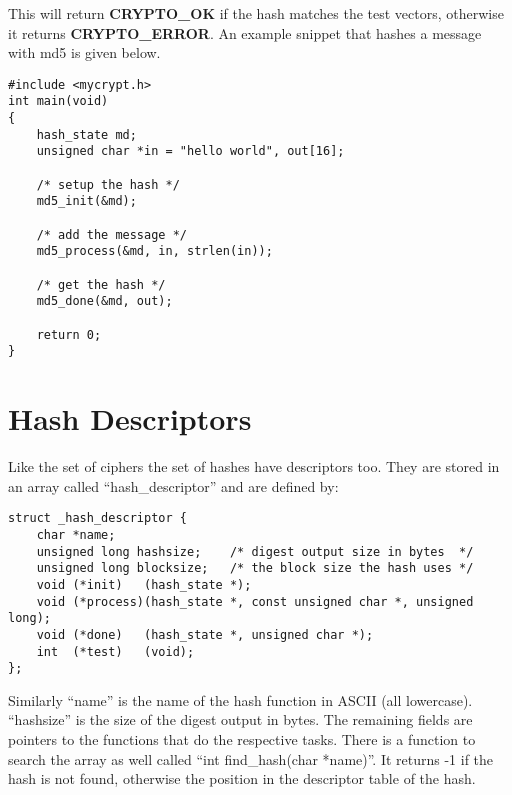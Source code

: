 \documentclass{book}
\begin{document}
This will return {\bf CRYPTO\_OK} if the hash matches the test vectors, otherwise it returns {\bf CRYPTO\_ERROR}.  An
example snippet that hashes a message with md5 is given below.
\begin{small}
\begin{verbatim}
#include <mycrypt.h>
int main(void)
{
    hash_state md;
    unsigned char *in = "hello world", out[16];

    /* setup the hash */
    md5_init(&md);

    /* add the message */
    md5_process(&md, in, strlen(in));

    /* get the hash */
    md5_done(&md, out);

    return 0;
}
\end{verbatim}
\end{small}

\section{Hash Descriptors}
Like the set of ciphers the set of hashes have descriptors too.  They are stored in an array called ``hash\_descriptor'' and
are defined by:
\begin{verbatim}
struct _hash_descriptor {
    char *name;
    unsigned long hashsize;    /* digest output size in bytes  */
    unsigned long blocksize;   /* the block size the hash uses */
    void (*init)   (hash_state *);
    void (*process)(hash_state *, const unsigned char *, unsigned long);
    void (*done)   (hash_state *, unsigned char *);
    int  (*test)   (void);
};
\end{verbatim}

Similarly ``name'' is the name of the hash function in ASCII (all lowercase).  ``hashsize'' is the size of the digest output
in bytes.  The remaining fields are pointers to the functions that do the respective tasks.  There is a function to
search the array as well called ``int find\_hash(char *name)''.  It returns -1 if the hash is not found, otherwise the
position in the descriptor table of the hash.
\end{document}
